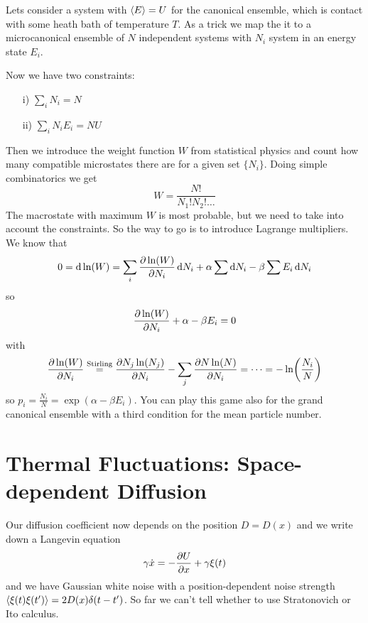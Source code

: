 \documentclass{notebook}
\begin{document}
Lets consider a system with $\expval{E} = U$ for the canonical ensemble, which is contact with some heath bath of temperature $T$. As a trick we map the it to a microcanonical ensemble of $N$ independent systems with $N_i$ system in an energy state $E_i$. 

Now we have two constraints:
%
\begin{itemize}
	\item[i)]  $\sum_i N_i = N$
	\item[ii)] $\sum_i N_i E_i = N U$
\end{itemize}
%

Then we introduce the weight function $W$ from statistical physics and count how many compatible microstates there are for a given set $\{ N_i \}$. Doing simple combinatorics we get
%
\begin{equation}
	W = \frac{N!}{N_1! N_2! \dots}
\end{equation}
%
The macrostate with maximum $W$ is most probable, but we need to take into account the constraints. So the way to go is to introduce Lagrange multipliers. We know that 
%
\begin{equation}
	0 = \dd{\ln(W)} = \sum_i \pdv{\ln(W)}{N_i} \dd{N_i} + \alpha \sum \dd{N_i} - \beta \sum E_i \dd{N_i}
\end{equation}
%
so
%
\begin{equation}
 \pdv{\ln(W)}{N_i} + \alpha - \beta E_i = 0
\end{equation}
%
with
%
\begin{equation}
\pdv{\ln(W)}{N_i} \overset{\mathrm{Stirling}}{=} \pdv{N_j \ln(N_j)}{N_i} - \sum_j \pdv{N \ln(N)}{N_i} = \dots = - \ln(\frac{N_i}{N})
\end{equation}
%
so $p_i = \frac{N_i}{N} = \exp(\alpha - \beta E_i)$. You can play this game also for the grand canonical ensemble with a third condition for the mean particle number.

\section{Thermal Fluctuations: Space-dependent Diffusion}

Our diffusion coefficient now depends on the position $D = D(x)$ and we write down a Langevin equation
%
\begin{equation}
	\gamma \dot{x} = - \pdv{U}{x} + \gamma \xi(t)
\end{equation}
%
and we have Gaussian white noise with a position-dependent noise strength $\expval{\xi(t)\xi(t')} = 2 D(x) \delta(t-t')$. So far we can't tell whether to use Stratonovich or Ito calculus.
\end{document}

